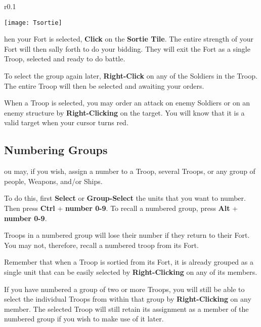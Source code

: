 \begin{wrapfigure}{r}{0.1\textwidth}
    \vspace{-20pt}
    \begin{center}
        \texttt{[image: Tsortie]}
    \end{center}
    \vspace{-20pt}
\end{wrapfigure}

hen your Fort is selected, \textbf{Click} on the \textbf{Sortie Tile}. The entire strength of your Fort will then sally forth to do your bidding. They will exit the Fort as a single Troop, selected and ready to do battle.

To select the group again later, \textbf{Right-Click} on any of the Soldiers in the Troop. The entire Troop will then be selected and awaiting your orders.

When a Troop is selected, you may order an attack on enemy Soldiers or on an enemy structure by \textbf{Right-Clicking} on the target. You will know that it is a valid target when your cursor turns red.

\subsection{\textsf{Numbering Groups}}



ou may, if you wish, assign a number to a Troop, several Troops, or any group of people, Weapons, and/or Ships.

To do this, first \textbf{Select} or \textbf{Group-Select} the units that you want to number. Then press \textbf{Ctrl} + \textbf{number 0-9}. To recall a numbered group, press \textbf{Alt} + \textbf{number 0-9}.

Troops in a numbered group will lose their number if they return to their Fort. You may not, therefore, recall a numbered troop from its Fort.

Remember that when a Troop is sortied from its Fort, it is already grouped as a single unit that can be easily selected by \textbf{Right-Clicking} on any of its members.

If you have numbered a group of two or more Troops, you will still be able to select the individual Troops from within that group by \textbf{Right-Clicking} on any member. The selected Troop will still retain its assignment as a member of the numbered group if you wish to make use of it later.

